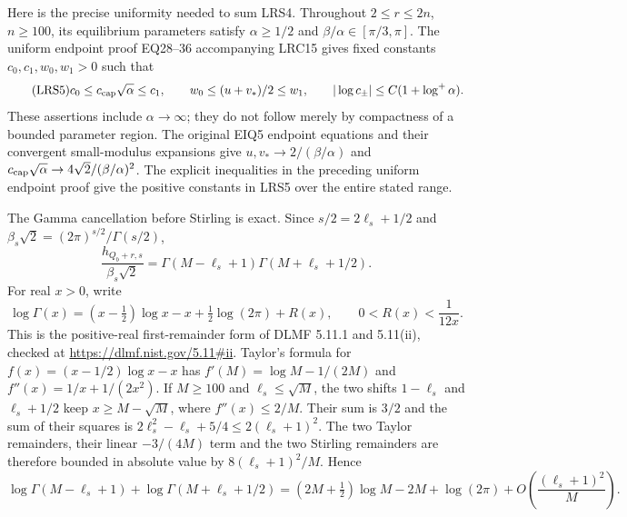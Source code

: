 Here is the precise uniformity needed to sum LRS4.  Throughout
$2\le r\le2n$, $n\ge100$, its equilibrium parameters satisfy
$\alpha\ge1/2$ and $\beta/\alpha\in[\pi/3,\pi]$.
The uniform endpoint proof EQ28--36 accompanying LRC15 gives fixed constants
$c_0,c_1,w_0,w_1>0$ such that
\begin{equation}\tag{LRS5}
 c_0\le c_{\rm cap}\sqrt\alpha\le c_1,
 \qquad w_0\le (u+v_*)/2\le w_1,
 \qquad |\log c_\pm|\le C(1+\log^+\alpha).
\end{equation}
These assertions include $\alpha\to\infty$; they do not follow
merely by compactness of a bounded parameter region.  The original
EIQ5 endpoint equations and their convergent small-modulus expansions
give $u,v_*\to2/(\beta/\alpha)$ and
$c_{\rm cap}\sqrt\alpha\to4\sqrt2/(\beta/\alpha)^2$.
The explicit inequalities in the preceding uniform endpoint proof
give the positive constants in LRS5 over the entire stated range.

The Gamma cancellation before Stirling is exact.  Since
$s/2=2\ell_s+1/2$ and
$\beta_s\sqrt2=(2\pi)^{s/2}/\Gamma(s/2)$,
\begin{equation}\tag{LRS6}
 \frac{h_{Q_b+r,s}}{\beta_s\sqrt2}
   =\Gamma(M-\ell_s+1)\Gamma(M+\ell_s+1/2).
\end{equation}
For real $x>0$, write
\[
 \log\Gamma(x)=(x-\tfrac12)\log x-x
              +\tfrac12\log(2\pi)+R(x),
 \qquad 0<R(x)<\frac1{12x}.
\]
This is the positive-real first-remainder form of DLMF
5.11.1 and 5.11(ii)\cite[\S5.11(i), equation~(5.11.1), and
\S5.11(ii)]{human:dlmf5}, checked at
\url{https://dlmf.nist.gov/5.11#ii}.
Taylor's formula for $f(x)=(x-1/2)\log x-x$ has
$f'(M)=\log M-1/(2M)$ and
$f''(x)=1/x+1/(2x^2)$.  If $M\ge100$ and $\ell_s\le\sqrt M$,
the two shifts $1-\ell_s$ and $\ell_s+1/2$ keep $x\ge M-\sqrt M$,
where $f''(x)\le2/M$.  Their sum is $3/2$ and the sum of their
squares is $2\ell_s^2-\ell_s+5/4\le2(\ell_s+1)^2$.
The two Taylor remainders, their linear $-3/(4M)$ term and the two
Stirling remainders are therefore bounded in absolute value by
$8(\ell_s+1)^2/M$.  Hence
\begin{equation}\tag{LRS7}
 \log\Gamma(M-\ell_s+1)+\log\Gamma(M+\ell_s+1/2)
 =(2M+\tfrac12)\log M-2M+\log(2\pi)
    +O\!\left(\frac{(\ell_s+1)^2}{M}\right).
\end{equation}

